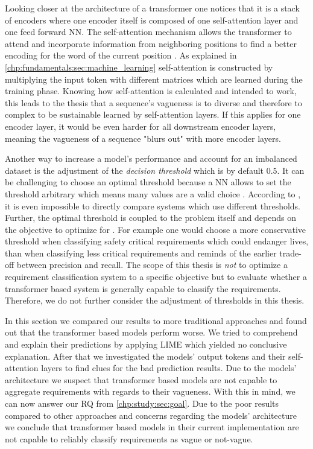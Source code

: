 Looking closer at the architecture of a transformer one notices that it is a stack of encoders where one encoder itself is composed of one self-attention layer and one feed forward \ac{NN}.
The self-attention mechanism allows the transformer to attend and incorporate information from neighboring positions to find a better encoding for the word of the current position \parencite{Vaswani:2017}.
As explained in \cref{chp:fundamentals:sec:machine_learning} self-attention is constructed by multiplying the input token with different matrices which are learned during the training phase.
Knowing how self-attention is calculated and intended to work, this leads to the thesis that a sequence's vagueness is to diverse and therefore to complex to be sustainable learned by self-attention layers.
If this applies for one encoder layer, it would be even harder for all downstream encoder layers, meaning the vagueness of a sequence "blurs out" with more encoder layers.

Another way to increase a model's performance and account for an imbalanced dataset is the adjustment of the \textit{decision threshold} which is by default $0.5$.
It can be challenging to choose an optimal threshold because a \ac{NN} allows to set the threshold arbitrary which means many values are a valid choice \parencite{Mazurowski:2008}.
According to \textcite{Mazurowski:2008}, it is even impossible to directly compare systems which use different thresholds.
Further, the optimal threshold is coupled to the problem itself and depends on the objective to optimize for \parencite{Brown:2019}.
For example one would choose a more conservative threshold when classifying safety critical requirements which could endanger lives, than when classifying less critical requirements and reminds of the earlier trade-off between precision and recall.
The scope of this thesis is \textit{not} to optimize a requirement classification system to a specific objective but to evaluate whether a transformer based system is generally capable to classify the requirements.
Therefore, we do not further consider the adjustment of thresholds in this thesis.

In this section we compared our results to more traditional approaches and found out that the transformer based models perform worse.
We tried to comprehend and explain their predictions by applying \ac{LIME} which yielded no conclusive explanation.
After that we investigated the models' output tokens and their self-attention layers to find clues for the bad prediction results.
Due to the models' architecture we suspect that transformer based models are not capable to aggregate requirements with regards to their vagueness.
With this in mind, we can now answer our \ac{RQ} from \cref{chp:study:sec:goal}.
Due to the poor results compared to other approaches and concerns regarding the models' architecture we conclude that transformer based models in their current implementation are not capable to reliably classify requirements as vague or not-vague.
